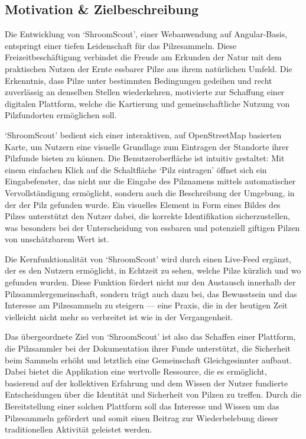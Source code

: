\documentclass[../main.tex]{subfiles} %
\begin{document}
\subsection{Motivation \& Zielbeschreibung} %

Die Entwicklung von `ShroomScout', einer Webanwendung auf Angular-Basis, entspringt einer tiefen Leidenschaft
für das Pilzesammeln. Diese Freizeitbeschäftigung verbindet die Freude am Erkunden der Natur mit dem praktischen
Nutzen der Ernte essbarer Pilze aus ihrem natürlichen Umfeld. Die Erkenntnis, dass Pilze unter bestimmten Bedingungen
gedeihen und recht zuverlässig an denselben Stellen wiederkehren, motivierte zur Schaffung einer digitalen Plattform,
welche die Kartierung und gemeinschaftliche Nutzung von Pilzfundorten ermöglichen soll.

`ShroomScout' bedient sich einer interaktiven, auf OpenStreetMap basierten Karte, um Nutzern eine visuelle
Grundlage zum Eintragen der Standorte ihrer Pilzfunde bieten zu können. Die Benutzeroberfläche ist intuitiv gestaltet:
Mit einem einfachen Klick auf die Schaltfläche `Pilz eintragen' öffnet sich ein Eingabefenster, das nicht nur die
Eingabe des Pilznamens mittels automatischer Vervollständigung ermöglicht, sondern auch die Beschreibung der Umgebung,
in der der Pilz gefunden wurde. Ein visuelles Element in Form eines Bildes des Pilzes unterstützt den Nutzer dabei,
die korrekte Identifikation sicherzustellen, was besonders bei der Unterscheidung von essbaren und potenziell giftigen
Pilzen von unschätzbarem Wert ist.

Die Kernfunktionalität von `ShroomScout' wird durch einen Live-Feed ergänzt, der es den Nutzern ermöglicht,
in Echtzeit zu sehen, welche Pilze kürzlich und wo gefunden wurden. Diese Funktion fördert nicht nur den
Austausch innerhalb der Pilzsammlergemeinschaft, sondern trägt auch dazu bei, das Bewusstsein und das
Interesse am Pilzesammeln zu steigern --- eine Praxis, die in der heutigen Zeit vielleicht nicht mehr so
verbreitet ist wie in der Vergangenheit.

Das übergeordnete Ziel von `ShroomScout' ist also das Schaffen einer Plattform, die Pilzsammler bei der Dokumentation
ihrer Funde unterstützt, die Sicherheit beim Sammeln erhöht und letztlich eine Gemeinschaft Gleichgesinnter
aufbaut. Dabei bietet die Applikation eine wertvolle Ressource, die es ermöglicht, basierend auf der kollektiven Erfahrung
und dem Wissen der Nutzer fundierte Entscheidungen über die Identität und Sicherheit von Pilzen zu treffen. Durch die
Bereitstellung einer solchen Plattform soll das Interesse und Wissen um das Pilzesammeln gefördert und somit einen Beitrag
zur Wiederbelebung dieser traditionellen Aktivität geleistet werden.
\end{document}
